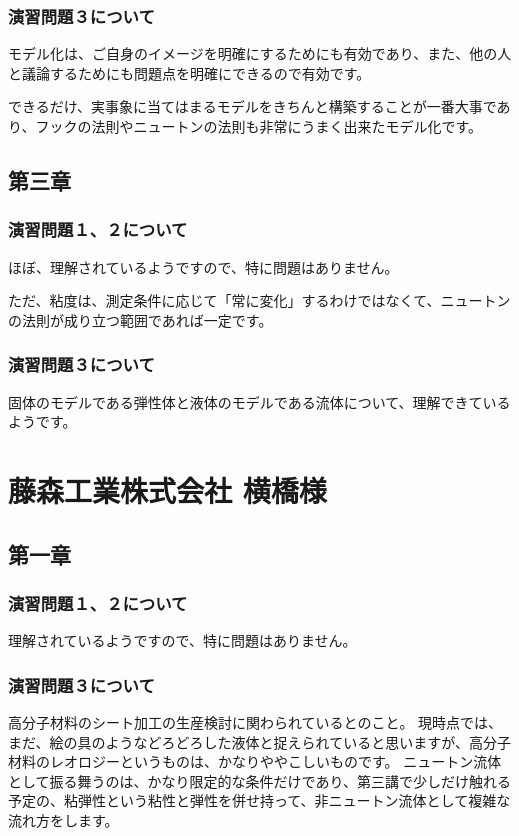 \documentclass[uplatex,dvipdfmx,a4paper,11pt]{jsreport}
\begin{document}
\subsubsection*{演習問題３について}

モデル化は、ご自身のイメージを明確にするためにも有効であり、また、他の人と議論するためにも問題点を明確にできるので有効です。

できるだけ、実事象に当てはまるモデルをきちんと構築することが一番大事であり、フックの法則やニュートンの法則も非常にうまく出来たモデル化です。
\subsection*{第三章}
\subsubsection*{演習問題１、２について}
ほぼ、理解されているようですので、特に問題はありません。

ただ、粘度は、測定条件に応じて「常に変化」するわけではなくて、ニュートンの法則が成り立つ範囲であれば一定です。

\subsubsection*{演習問題３について}

固体のモデルである弾性体と液体のモデルである流体について、理解できているようです。

\clearpage
\section*{藤森工業株式会社 横橋様}
\subsection*{第一章}
\subsubsection*{演習問題１、２について}
理解されているようですので、特に問題はありません。

\subsubsection*{演習問題３について}
高分子材料のシート加工の生産検討に関わられているとのこと。
現時点では、まだ、絵の具のようなどろどろした液体と捉えられていると思いますが、高分子材料のレオロジーというものは、かなりややこしいものです。
ニュートン流体として振る舞うのは、かなり限定的な条件だけであり、第三講で少しだけ触れる予定の、粘弾性という粘性と弾性を併せ持って、非ニュートン流体として複雑な流れ方をします。
\end{document}
